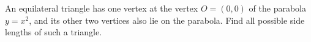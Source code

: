 An equilateral triangle has one vertex at the vertex $O=(0,0)$ of the parabola $y=x^2$, and its other two vertices also lie on the parabola. Find all possible side lengths of such a triangle.
